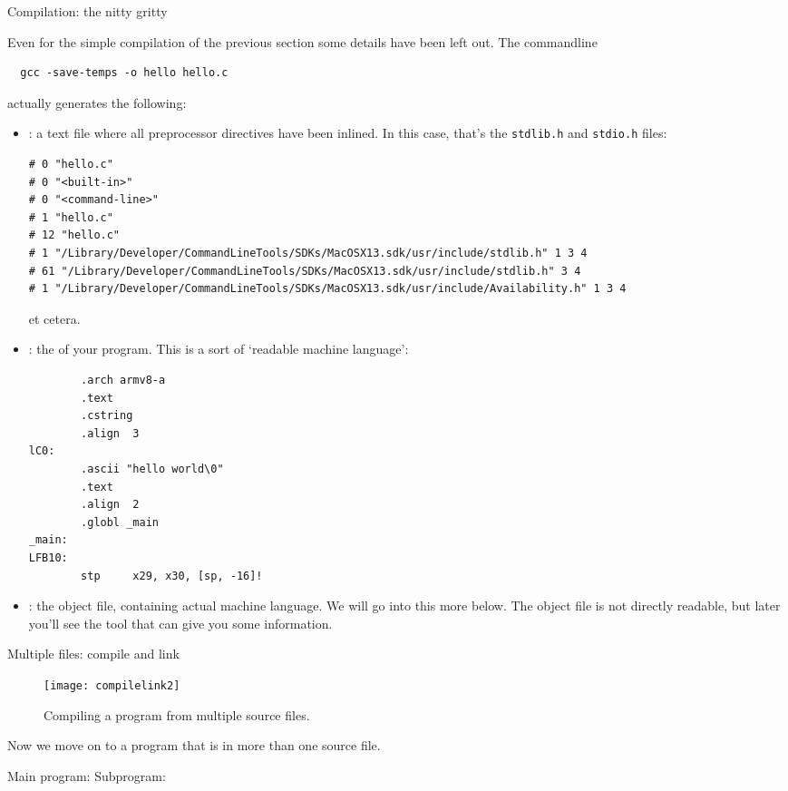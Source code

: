  {Compilation: the nitty gritty}

Even for the simple compilation of the previous section
some details have been left out.
The commandline
\begin{lstlisting}
  gcc -save-temps -o hello hello.c
\end{lstlisting}
actually generates the following:
\begin{itemize}
\item {}: a text file where all preprocessor directives have been inlined.
  In this case, that's the \lstinline{stdlib.h} and \lstinline{stdio.h} files:
\begin{lstlisting}
# 0 "hello.c"
# 0 "<built-in>"
# 0 "<command-line>"
# 1 "hello.c"
# 12 "hello.c"
# 1 "/Library/Developer/CommandLineTools/SDKs/MacOSX13.sdk/usr/include/stdlib.h" 1 3 4
# 61 "/Library/Developer/CommandLineTools/SDKs/MacOSX13.sdk/usr/include/stdlib.h" 3 4
# 1 "/Library/Developer/CommandLineTools/SDKs/MacOSX13.sdk/usr/include/Availability.h" 1 3 4    
\end{lstlisting}
et cetera.
\item {}: the  of your program.
  This is a sort of `readable machine language':
\begin{lstlisting}
        .arch armv8-a
        .text
        .cstring
        .align  3
lC0:
        .ascii "hello world\0"
        .text
        .align  2
        .globl _main
_main:
LFB10:
        stp     x29, x30, [sp, -16]!    
\end{lstlisting}
\item {}: the object file, containing actual machine language.
  We will go into this more below.
  The object file is not directly readable, but later
  you'll see the  tool that can give you some information.
\end{itemize}
 {Multiple files: compile and link}

\begin{figure}[ht]
  \texttt{[image: compilelink2]}
  \caption{Compiling a program from multiple source files.}
  \label{fig:compilelink2}
\end{figure}

Now we move on to a program that is in more than one source file.

\begin{multicols}{2}
  Main program: 
  \columnbreak
  Subprogram: 
\end{multicols}

